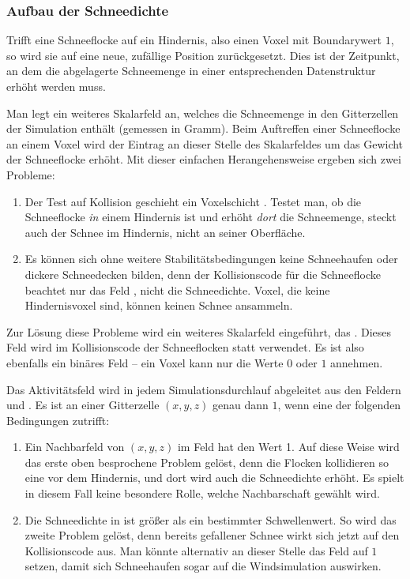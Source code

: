 \subsubsection{Aufbau der Schneedichte}

Trifft eine Schneeflocke auf ein Hindernis, also einen Voxel mit
Boundarywert $1$, so wird sie auf eine neue, zufällige Position
zurückgesetzt. Dies ist der Zeitpunkt, an dem die abgelagerte
Schneemenge in einer entsprechenden Datenstruktur erhöht werden muss.

Man legt ein weiteres Skalarfeld  an,
welches die Schneemenge in den Gitterzellen der Simulation enthält
(\PimiddyzB gemessen in Gramm). Beim Auftreffen einer Schneeflocke an
einem Voxel wird der Eintrag an dieser Stelle des Skalarfeldes um das
Gewicht der Schneeflocke erhöht. Mit dieser einfachen Herangehensweise
ergeben sich zwei Probleme:

\begin{enumerate}
\item Der Test auf Kollision geschieht ein Voxelschicht
. Testet man, ob die Schneeflocke \emph{in}
einem Hindernis ist und erhöht \emph{dort} die Schneemenge, steckt
auch der Schnee im Hindernis, nicht an seiner Oberfläche.
\item Es können sich ohne weitere Stabilitätsbedingungen keine
Schneehaufen oder dickere Schneedecken bilden, denn der Kollisionscode
für die Schneeflocke beachtet nur das Feld
, nicht die Schneedichte. Voxel, die keine
Hindernisvoxel sind, können keinen Schnee ansammeln.
\end{enumerate}

Zur Lösung diese Probleme wird ein weiteres Skalarfeld eingeführt, das
 . Dieses
Feld wird im Kollisionscode der Schneeflocken statt
 verwendet. Es ist also ebenfalls ein
binäres Feld -- ein Voxel kann nur die Werte $0$ oder $1$ annehmen.

Das Aktivitätsfeld wird in jedem Simulationsdurchlauf abgeleitet aus
den Feldern  und
. Es ist an einer Gitterzelle
$(x,y,z)$ genau dann $1$, wenn eine der folgenden Bedingungen
zutrifft:

\begin{enumerate}
\item Ein Nachbarfeld von $(x,y,z)$ im Feld
 hat den Wert 1. Auf diese Weise wird das
erste oben besprochene Problem gelöst, denn die Flocken kollidieren so
eine  vor dem Hindernis, und dort wird auch die
Schneedichte erhöht. Es spielt in diesem Fall keine besondere Rolle,
welche Nachbarschaft gewählt wird.
\item Die Schneedichte in  ist größer
als ein bestimmter Schwellenwert. So wird das zweite Problem gelöst,
denn bereits gefallener Schnee wirkt sich jetzt auf den Kollisionscode
aus. Man könnte alternativ an dieser Stelle das Feld
 auf $1$ setzen, damit sich Schneehaufen
sogar auf die Windsimulation auswirken.
\end{enumerate}

